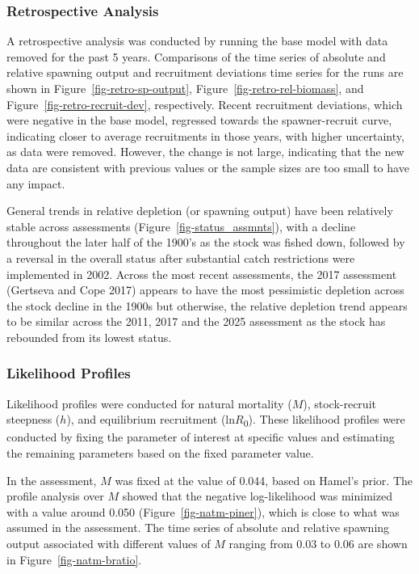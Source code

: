 \documentclass[
]{scrartcl}
\begin{document}
\subsubsection{Retrospective Analysis}\label{retrospective-analysis}

A retrospective analysis was conducted by running the base model with
data removed for the past 5 years. Comparisons of the time series of
absolute and relative spawning output and recruitment deviations time
series for the runs are shown in Figure~\ref{fig-retro-sp-output},
Figure~\ref{fig-retro-rel-biomass}, and
Figure~\ref{fig-retro-recruit-dev}, respectively. Recent recruitment
deviations, which were negative in the base model, regressed towards the
spawner-recruit curve, indicating closer to average recruitments in
those years, with higher uncertainty, as data were removed. However, the
change is not large, indicating that the new data are consistent with
previous values or the sample sizes are too small to have any impact.

General trends in relative depletion (or spawning output) have been
relatively stable across assessments (Figure~\ref{fig-status_assmnts}),
with a decline throughout the later half of the 1900's as the stock was
fished down, followed by a reversal in the overall status after
substantial catch restrictions were implemented in 2002. Across the most
recent assessments, the 2017 assessment (Gertseva and Cope 2017) appears
to have the most pessimistic depletion across the stock decline in the
1900s but otherwise, the relative depletion trend appears to be similar
across the 2011, 2017 and the 2025 assessment as the stock has rebounded
from its lowest status.

\subsubsection{Likelihood Profiles}\label{likelihood-profiles}

Likelihood profiles were conducted for natural mortality (\(M\)),
stock-recruit steepness (\(h\)), and equilibrium recruitment
(ln\(R\)\textsubscript{0}). These likelihood profiles were conducted by
fixing the parameter of interest at specific values and estimating the
remaining parameters based on the fixed parameter value.

In the assessment, \(M\) was fixed at the value of 0.044, based on
Hamel's prior. The profile analysis over \(M\) showed that the negative
log-likelihood was minimized with a value around 0.050
(Figure~\ref{fig-natm-piner}), which is close to what was assumed in the
assessment. The time series of absolute and relative spawning output
associated with different values of \(M\) ranging from 0.03 to 0.06 are
shown in Figure~\ref{fig-natm-bratio}.
\end{document}
